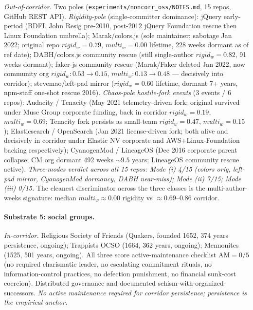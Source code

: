 \documentclass[11pt,a4paper]{article}
\begin{document}
\emph{Out-of-corridor.} Two poles (\texttt{experiments/noncorr\_oss/NOTES.md}, 15 repos, GitHub REST API). \emph{Rigidity-pole} (single-committer dominance): jQuery early-period (BDFL John Resig pre-2010, post-2012 jQuery Foundation rescue then Linux Foundation umbrella); Marak/colors.js (sole maintainer; sabotage Jan 2022; original repo $rigid_w = 0.79$, $multi_w = 0.00$ lifetime, 228 weeks dormant as of ref date); DABH/colors.js community rescue (still single-author $rigid_w = 0.82$, 91 weeks dormant); faker-js community rescue (Marak/Faker deleted Jan 2022, now community org $rigid_w: 0.53 \to 0.15$, $multi_w: 0.13 \to 0.48$ --- decisively into corridor); stevemao/left-pad mirror ($rigid_w = 0.60$ lifetime, dormant 7+ years, npm-staff one-shot rescue 2016). \emph{Chaos-pole hostile-fork events} (3 events / 6 repos): Audacity / Tenacity (May 2021 telemetry-driven fork; original survived under Muse Group corporate funding, back in corridor $rigid_w = 0.19$, $multi_w = 0.69$; Tenacity fork persists as small-team $rigid_w = 0.47$, $multi_w = 0.15$); Elasticsearch / OpenSearch (Jan 2021 license-driven fork; both alive and decisively in corridor under Elastic NV corporate and AWS+Linux-Foundation backing respectively); CyanogenMod / LineageOS (Dec 2016 corporate parent collapse; CM org dormant 492 weeks $\sim 9.5$ years; LineageOS community rescue active). \emph{Three-modes verdict across all 15 repos: Mode (i) 4/15 (colors orig, left-pad mirror, CyanogenMod dormancy, DABH near-miss); Mode (ii) 7/15; Mode (iii) 0/15.} The cleanest discriminator across the three classes is the multi-author-weeks signature: median $multi_w \approx 0.00$ rigidity vs $\approx 0.69$--$0.86$ corridor.

\paragraph{Substrate 5: social groups.}

\emph{In-corridor.} Religious Society of Friends (Quakers, founded 1652, 374 years persistence, ongoing); Trappists OCSO (1664, 362 years, ongoing); Mennonites (1525, 501 years, ongoing). All three score active-maintenance checklist $\text{AM} = 0/5$ (no required charismatic leader, no escalating commitment rituals, no information-control practices, no defection punishment, no financial sunk-cost coercion). Distributed governance and documented schism-with-organized-successors. \emph{No active maintenance required for corridor persistence; persistence is the empirical anchor.}
\end{document}
